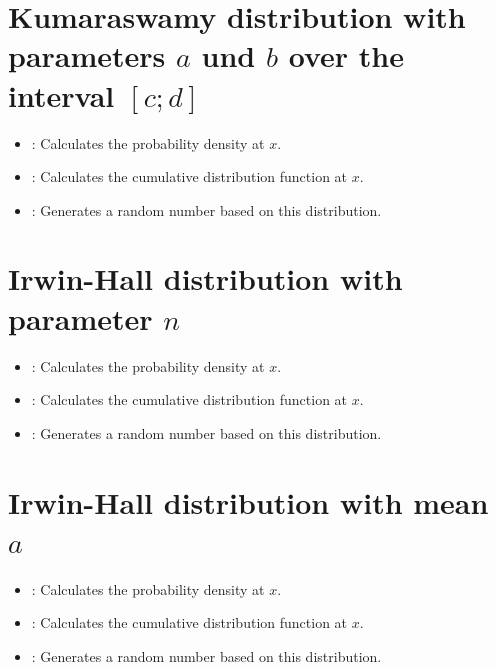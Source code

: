 \section{Kumaraswamy distribution with parameters \texorpdfstring{$a$}{a} und \texorpdfstring{$b$}{b} over the interval \texorpdfstring{$[c;d]$}{[c;d]}}

\begin{itemize}

\item
{}:
Calculates the probability density at $x$.

\item
{}:
Calculates the cumulative distribution function at $x$.

\item
{}:
Generates a random number based on this distribution.

\end{itemize}



\section{Irwin-Hall distribution with parameter \texorpdfstring{$n$}{n}}

\begin{itemize}

\item
{}:
Calculates the probability density at $x$.

\item
{}:
Calculates the cumulative distribution function at $x$.

\item
{}:
Generates a random number based on this distribution.

\end{itemize}



\section{Irwin-Hall distribution with mean \texorpdfstring{$a$}{a}}

\begin{itemize}

\item
{}:
Calculates the probability density at $x$.

\item
{}:
Calculates the cumulative distribution function at $x$.

\item
{}:
Generates a random number based on this distribution.

\end{itemize}



